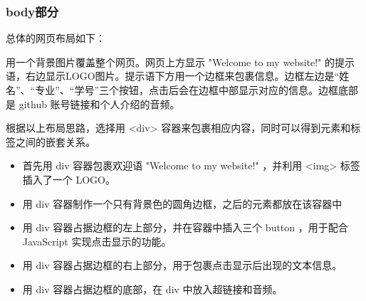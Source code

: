 \documentclass[UTF8,a4paper,10pt]{ctexart}
\begin{document}
\subsubsection{body部分}
\noindent 总体的网页布局如下：\par
\vspace{ 0.3cm}
用一个背景图片覆盖整个网页。网页上方显示 "Welcome to my website!" 的提示语，右边显示LOGO图片。提示语下方用一个边框来包裹信息。边框左边是“姓名”、“专业”、“学号”三个按钮，点击后会在边框中部显示对应的信息。边框底部是 github 账号链接和个人介绍的音频。 \par
根据以上布局思路，选择用 <div> 容器来包裹相应内容，同时可以得到元素和标签之间的嵌套关系。
\begin{itemize}
\item 首先用 div 容器包裹欢迎语 "Welcome to my website!" ，并利用 <img> 标签插入了一个 LOGO。
\item 用 div 容器制作一个只有背景色的圆角边框，之后的元素都放在该容器中
\item 用 div 容器占据边框的左上部分，并在容器中插入三个 button ，用于配合 JavaScript 实现点击显示的功能。
\item 用 div 容器占据边框的右上部分，用于包裹点击显示后出现的文本信息。
\item 用 div 容器占据边框的底部，在 div 中放入超链接和音频。
\end{itemize}
\end{document}
